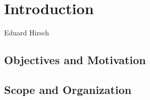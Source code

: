 \chapter{Introduction}
\label{ch:Introduction}

\vspace{-1cm}
\begin{center}
Eduard Hirsch
\end{center}


\section{Objectives and Motivation}

\section{Scope and Organization}



\newpage
